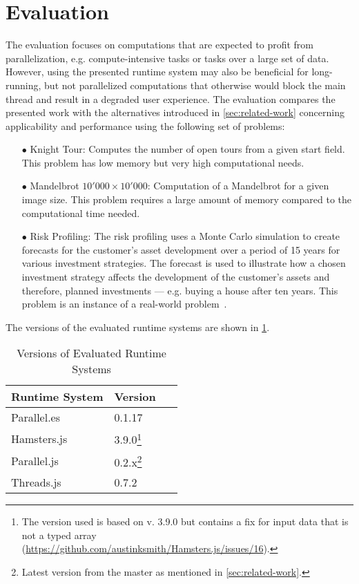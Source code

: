 \section{Evaluation}\label{sec:evaluation}
The evaluation focuses on computations that are expected to profit from parallelization, e.g. compute-intensive tasks or tasks over a large set of data. However, using the presented runtime system may also be beneficial for long-running, but not parallelized computations that otherwise would block the main thread and result in a degraded user experience. The evaluation compares the presented work with the alternatives introduced in \cref{sec:related-work} concerning applicability and performance using the following set of problems:

\begin{itemize}
	\item[$\bullet$] Knight Tour: Computes the number of open tours from a given start field. This problem has  low memory but very high computational needs.
	\item[$\bullet$] Mandelbrot $10'000 \times 10'000$: Computation of a Mandelbrot for a given image size. This problem requires a large amount of memory compared to the computational time needed.
	\item[$\bullet$] Risk Profiling: The risk profiling uses a Monte Carlo simulation to create forecasts for the customer's asset development over a period of 15 years for various investment strategies. The forecast is used to illustrate how a chosen investment strategy affects the development of the customer's assets and therefore, planned investments --- e.g. buying a house after ten years. This problem is an instance of a real-world problem~\cite{Kwsoft2016}.
\end{itemize}

The versions of the evaluated runtime systems are shown in \cref{tab:runtime-system-version}.

\begin{table}
	\centering
	\begin{tabular}{p{0.6\linewidth} l}
		\toprule
		Runtime System & Version \\ \midrule
		Parallel.es & 0.1.17 \\
		Hamsters.js & 3.9.0\footnote{The version used is based on v. 3.9.0 but contains a fix for input data that is not a typed array (\url{https://github.com/austinksmith/Hamsters.js/issues/16}).} \\
		Parallel.js & 0.2.x\footnote{Latest version from the master as mentioned in \cref{sec:related-work}.} \\
		Threads.js & 0.7.2 \\ \bottomrule
	\end{tabular}
	\caption{Versions of Evaluated Runtime Systems}
	\label{tab:runtime-system-version}
\end{table}


